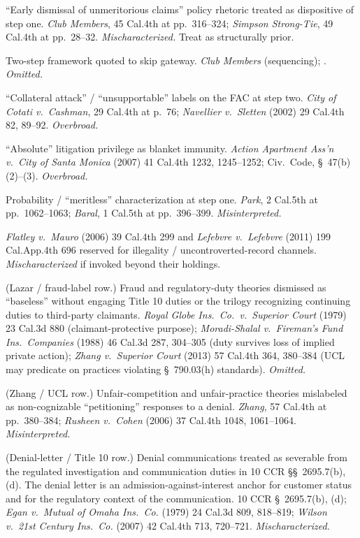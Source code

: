 \begin{description}
\tightlist
\item[A-1.] ``Early dismissal of unmeritorious claims'' policy rhetoric treated as dispositive of step one. \textit{Club Members}, 45 Cal.4th at pp.\ 316--324; \textit{Simpson Strong-Tie}, 49 Cal.4th at pp.\ 28--32. \textit{Mischaracterized.} Treat  as structurally prior.
\item[A-2.] Two-step  framework quoted to skip  gateway. \textit{Club Members} (sequencing); . \textit{Omitted.}
\item[A-3.] ``Collateral attack'' / ``unsupportable'' labels on the FAC at step two. \textit{City of Cotati v.\ Cashman}, 29 Cal.4th at p.\ 76; \textit{Navellier v.\ Sletten} (2002) 29 Cal.4th 82, 89--92. \textit{Overbroad.}
\item[A-4.] ``Absolute'' litigation privilege as blanket immunity. \textit{Action Apartment Ass'n v.\ City of Santa Monica} (2007) 41 Cal.4th 1232, 1245--1252; Civ.\ Code, \S~47(b)(2)--(3). \textit{Overbroad.}
\item[A-5.] Probability / ``meritless'' characterization at step one. \textit{Park}, 2 Cal.5th at pp.\ 1062--1063; \textit{Baral}, 1 Cal.5th at pp.\ 396--399. \textit{Misinterpreted.}
\item[A-6.] \textit{Flatley v.\ Mauro} (2006) 39 Cal.4th 299 and \textit{Lefebvre v.\ Lefebvre} (2011) 199 Cal.App.4th 696 reserved for illegality / uncontroverted-record channels. \textit{Mischaracterized} if invoked beyond their holdings.
\item[A-7.] (Lazar / fraud-label row.) Fraud and regulatory-duty theories dismissed as ``baseless'' without engaging Title 10 duties or the trilogy recognizing continuing duties to third-party claimants. \textit{Royal Globe Ins.\ Co.\ v.\ Superior Court} (1979) 23 Cal.3d 880 (claimant-protective purpose); \textit{Moradi-Shalal v.\ Fireman's Fund Ins.\ Companies} (1988) 46 Cal.3d 287, 304--305 (duty survives loss of implied private action); \textit{Zhang v.\ Superior Court} (2013) 57 Cal.4th 364, 380--384 (UCL may predicate on practices violating \S~790.03(h) standards). \textit{Omitted.}
\item[A-8.] (Zhang / UCL row.) Unfair-competition and unfair-practice theories mislabeled as non-cognizable ``petitioning'' responses to a denial. \textit{Zhang}, 57 Cal.4th at pp.\ 380--384; \textit{Rusheen v.\ Cohen} (2006) 37 Cal.4th 1048, 1061--1064. \textit{Misinterpreted.}
\item[A-9.] (Denial-letter / Title 10 row.) Denial communications treated as severable from the regulated investigation and communication duties in 10 CCR \S\S~2695.7(b), (d). The denial letter is an admission-against-interest anchor for customer status and for the regulatory context of the communication. 10 CCR \S~2695.7(b), (d); \textit{Egan v.\ Mutual of Omaha Ins.\ Co.} (1979) 24 Cal.3d 809, 818--819; \textit{Wilson v.\ 21st Century Ins.\ Co.} (2007) 42 Cal.4th 713, 720--721. \textit{Mischaracterized.}
\end{description}

